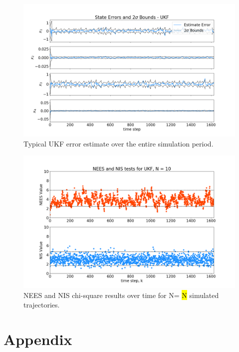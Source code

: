 \documentclass[11pt, a4paper]{article}
\begin{document}
\begin{figure}[H]
	\centering
	\includegraphics[width=\textwidth]{Figures/ukf_estimate_th.png}
	\caption{Typical UKF error estimate over the entire simulation period.}
	\label{fig:ukf_est}
\end{figure}

\begin{figure}[H]
	\centering
	\includegraphics[width=\textwidth]{./Figures/NEESNIS_ukf_N10Q1.0E-09.png}
	\caption{NEES and NIS chi-square results over time for N= \hl{N} simulated trajectories.}
	\label{fig:neesnis_ukf}
\end{figure}




\newpage
\section*{Appendix}
%
\end{document}
